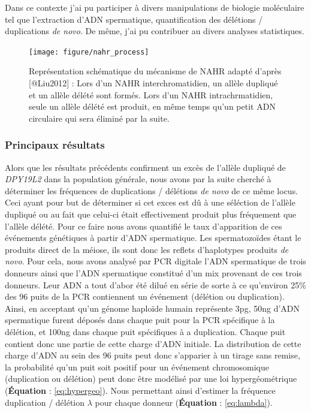 \documentclass[12pt,twoside]{reedthesis}
\begin{document}
  Dans ce contexte j'ai pu participer à divers manipulations de biologie
  moléculaire tel que l'extraction d'ADN spermatique, quantification des
  délétions / duplications \emph{de novo}. De même, j'ai pu contribuer au
  divers analyses statistiques.
  
  \newpage 
  
  \begin{figure}
  
  {\centering \texttt{[image: figure/nahr\_process]} 
  
  }
  
  \caption[Représentation schématique du mécanisme de NAHR]{Représentation schématique du mécanisme de NAHR adapté d'après [@Liu2012] : Lors d'un NAHR interchromatidien, un allèle dupliqué et un allèle délété sont formés. Lors d'un NAHR intrachrmatidien, seule un allèle délété est produit, en même temps qu'un petit ADN circulaire qui sera éliminé par la suite.}\label{fig:nahr}
  \end{figure}
  
  \newpage
  
  
  
  \newpage
  
  \subsubsection{Principaux résultats}\label{principaux-resultats}
  
  Alors que les résultats précédents confirment un excès de l'allèle
  dupliqué de \emph{DPY19L2} dans la population générale, nous avons par
  la suite cherché à déterminer les fréquences de duplications / délétions
  \emph{de novo} de ce même locus. Ceci ayant pour but de déterminer si
  cet exces est dû à une séléction de l'allèle dupliqué ou au fait que
  celui-ci était effectivement produit plus fréquement que l'allèle
  délété. Pour ce faire nous avons quantifié le taux d'apparition de ces
  événements génétiques à partir d'ADN spermatique. Les spermatozoïdes
  étant le produits direct de la méiose, ils sont donc les reflets
  d'haplotypes produits \emph{de novo}. Pour cela, nous avons analysé par
  PCR digitale l'ADN spermatique de trois donneurs ainsi que l'ADN
  spermatique constitué d'un mix provenant de ces trois donneurs. Leur ADN
  a tout d'abor été dilué en série de sorte à ce qu'environ 25\% des 96
  puits de la PCR contiennent un événement (délétion ou duplication).
  Ainsi, en acceptant qu'un génome haploïde humain représente 3pg, 50ng
  d'ADN spermatique furent déposés dans chaque puit pour la PCR spécifique
  à la délétion, et 100ng dans chaque puit spécifiques à a duplication.
  Chaque puit contient donc une partie de cette charge d'ADN initiale. La
  distribution de cette charge d'ADN au sein des 96 puits peut donc
  s'apparier à un tirage sans remise, la probabilité qu'un puit soit
  positif pour un événement chromosomique (duplication ou délétion) peut
  donc être modélisé par une loi hypergéométrique (\textbf{Équation} :
  \eqref{eq:hypergeo}). Nous permettant ainsi d'estimer la fréquence
  duplication / délétion \(\lambda\) pour chaque donneur
  (\textbf{Équation} : \eqref{eq:lambda}).\\
  
\end{document}
